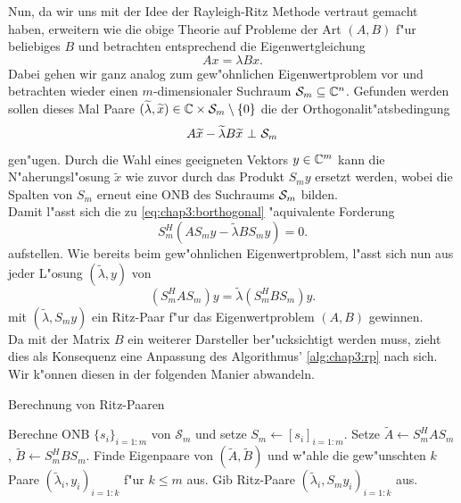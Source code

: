 Nun, da wir uns mit der Idee der Rayleigh-Ritz Methode vertraut gemacht haben, erweitern wie die obige Theorie auf Probleme der Art $(A,B)$ f"ur beliebiges $B$ und betrachten entsprechend die Eigenwertgleichung
\begin{equation}\label{eq:chap3:gevp}
Ax = \lambda Bx.
\end{equation}
Dabei gehen wir ganz analog zum gew"ohnlichen Eigenwertproblem vor und betrachten wieder
einen $m$-dimensionaler Suchraum $\S_m\subseteq \Cn$.
Gefunden werden sollen dieses Mal Paare $ (\widetilde{\lambda}, \widetilde{x}) \in \C
\times \S_m \setminus\{ 0\}$ die der Orthogonalit"atsbedingung
\begin{equation}\label{eq:chap3:borthogonal}
A\widetilde{x} - \widetilde{\lambda}B\widetilde{x} \ \bot \ \S_m
\end{equation}
gen"ugen. Durch die Wahl eines geeigneten Vektors $y\in\C^m$ kann die N"aherungsl"osung $\widetilde{x}$ wie zuvor durch das Produkt $S_m y$ ersetzt werden, wobei die Spalten von $S_m$ erneut eine ONB des Suchraums $\S_m$ bilden.\\

Damit l"asst sich die zu \eqref{eq:chap3:borthogonal} "aquivalente Forderung
\[
S_m^H(AS_m y - \widetilde{\lambda} BS_m y) = 0.
\]
aufstellen. Wie bereits beim gew"ohnlichen Eigenwertproblem, l"asst sich nun aus jeder L"osung
$(\widetilde{\lambda}, y)$ von
\begin{equation}\label{eq:chap3:transformedevp}
(S_m^H AS_m) y = \widetilde{\lambda} (S_m^H B S_m) y.
\end{equation}
mit $(\widetilde{\lambda}, S_m y)$ ein Ritz-Paar f"ur das Eigenwertproblem $(A,B)$ gewinnen.\\

Da mit der Matrix $B$ ein weiterer Darsteller ber"ucksichtigt werden muss, zieht dies als Konsequenz eine Anpassung des Algorithmus' \ref{alg:chap3:rp} nach sich. Wir k"onnen diesen in der folgenden Manier abwandeln.

\begin{algorithm}
\caption{Berechnung von Ritz-Paaren}\label{alg:chap3:grp}
\begin{algorithmic}[1]
\State Berechne ONB $\{s_i\}_{i=1:m}$ von $\mathcal{S}_m$ und setze $S_m\gets[s_i]_{i=1:m}$.
\State Setze $\widetilde{A}\gets S_m^H A S_m$,
$\widetilde{B} \gets S_m^H BS_m$.
\State Finde Eigenpaare von $(\widetilde{A},\widetilde{B})$ und w"ahle die gew"unschten $k$ Paare $(\widetilde{\lambda}_i,y_i)_{i=1:k}$ f"ur $k\le m$ aus.
\State Gib Ritz-Paare $(\widetilde{\lambda}_i, S_m y_i)_{i=1:k}$ aus.
\end{algorithmic}
\end{algorithm}

